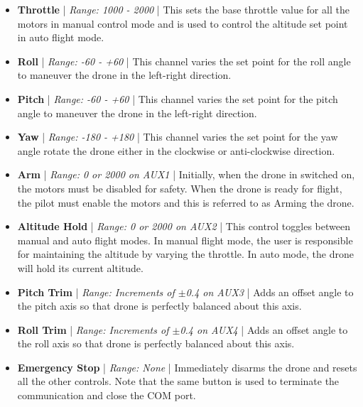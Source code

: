 \documentclass[a4paper,12pt,oneside]{book}
\begin{document}
\begin{itemize}
\item \textbf{Throttle} | \textit{Range: 1000 - 2000} | This sets the base throttle value for all the motors in manual control mode and is used to control the altitude set point in auto flight mode.\\

\item \textbf{Roll} | \textit{Range: -60 - +60} | This channel varies the set point for the roll angle to maneuver the drone in the left-right direction.\\

\item \textbf{Pitch} | \textit{Range: -60 - +60} | This channel varies the set point for the pitch angle to maneuver the drone in the left-right direction.\\

\item \textbf{Yaw} | \textit{Range: -180 - +180} | This channel varies the set point for the yaw angle rotate the drone either in the clockwise or anti-clockwise direction.\\

\item \textbf{Arm} | \textit{Range: 0 or 2000 on AUX1} | Initially, when the drone in switched on, the motors must be disabled for safety. When the drone is ready for flight, the pilot must enable the motors and this is referred to as Arming the drone.\\

\item \textbf{Altitude Hold} | \textit{Range: 0 or 2000 on AUX2} | This control toggles between manual and auto flight modes. In manual flight mode, the user is responsible for maintaining the altitude by varying the throttle. In auto mode, the drone will hold its current altitude.\\

\item \textbf{Pitch Trim} | \textit{Range: Increments of $\pm$0.4 on AUX3} | Adds an offset angle to the pitch axis so that drone is perfectly balanced about this axis.\\

\item \textbf{Roll Trim} | \textit{Range: Increments of $\pm$0.4 on AUX4} | Adds an offset angle to the roll axis so that drone is perfectly balanced about this axis.\\

\item \textbf{Emergency Stop} | \textit{Range: None} | Immediately disarms the drone and resets all the other controls. Note that the same button is used to terminate the communication and close the COM port.

\end{itemize}
\end{document}
